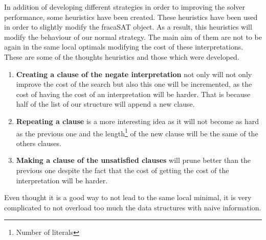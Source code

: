
In addition of developing different strategies in order to improving the solver performance, some heuristics have been created.
These heuristics have been used in order to slightly modify the fracaSAT object. As a result, this heuristics will modify the behaviour of our normal strategy. The main aim of them are not to be again in the same local optimals modifying the cost of these interpretations. These are some of the thoughts heuristics and those which were developed.
\begin{enumerate}
\item \textbf{Creating a clause of the negate interpretation} not only will not only improve the cost of the search but also this one will be incremented, as the cost of having the cost of an interpretation will be harder. That is because half of the list of our structure will append a new clause.
\item \textbf{Repeating a clause} is a more interesting idea as it will not become as hard as the previous one and the length\footnote{Number of literals} of the new clause will be the same of the others clauses.
\item \textbf{Making a clause of the unsatisfied clauses} will prune better than the previous one despite the fact that the cost of getting the cost of the interpretation will be harder.
\end{enumerate}
Even thought it is a good way to not lead to the same local minimal, it is very complicated to not overload too much the data structures with naive information.
